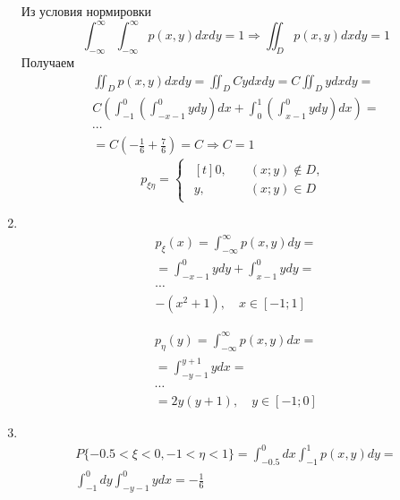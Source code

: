 \documentclass[12pt]{article}
\begin{document}
\begin{enumerate}
	      Из условия нормировки
	      \begin{equation*}
		      \int_{-\infty}^{\infty}\int_{-\infty}^{\infty}p(x,y)dxdy = 1 \Rightarrow \iint_{D}p(x,y)dxdy = 1
	      \end{equation*}
	      Получаем
	      \begin{gather*}
		      \iint_{D}p(x,y)dxdy = \iint_{D}Cydxdy = C\iint_{D}ydxdy = \\
		      C \left( \int_{-1}^{0}\left(\int_{-x-1}^{0}ydy\right)dx + \int_{0}^{1}\left(\int_{x-1}^{0}ydy\right)dx \right) = \\
		      \cdots \\
		      = C \left(-\frac{1}{6} + \frac{7}{6}\right) = C \Rightarrow C = 1
	      \end{gather*}
	      \begin{equation*}
		      p_{\xi\eta} =
		      \begin{cases}
			      \begin{aligned}[t]
				      0, & \quad (x;y) \notin D, \\
				      y, & \quad (x;y) \in D
			      \end{aligned}
		      \end{cases}
	      \end{equation*}

	\item \mbox{}\\
	      \begin{gather*}
		      p_\xi(x) = \int_{-\infty}^{\infty}p(x,y)dy = \\
		      = \int_{-x-1}^{0}ydy + \int_{x-1}^{0}ydy = \\
		      \cdots \\
		      -(x^2 + 1), \quad x \in [-1; 1]
	      \end{gather*}

	      \begin{gather*}
		      p_\eta(y) = \int_{-\infty}^{\infty}p(x,y)dx = \\
		      = \int_{-y-1}^{y+1}ydx = \\
		      \cdots \\
		      = 2y(y + 1), \quad y \in [-1; 0]
	      \end{gather*}

	\item \mbox{}\\
	      \begin{gather*}
		      P\{-0.5 < \xi < 0, -1 < \eta < 1\} = \int_{-0.5}^{0}dx\int_{-1}^{1}p(x,y)dy = \\
		      \int_{-1}^{0}dy\int_{-y-1}^{0}ydx = -\frac{1}{6}
	      \end{gather*}


\end{enumerate}
\end{document}
